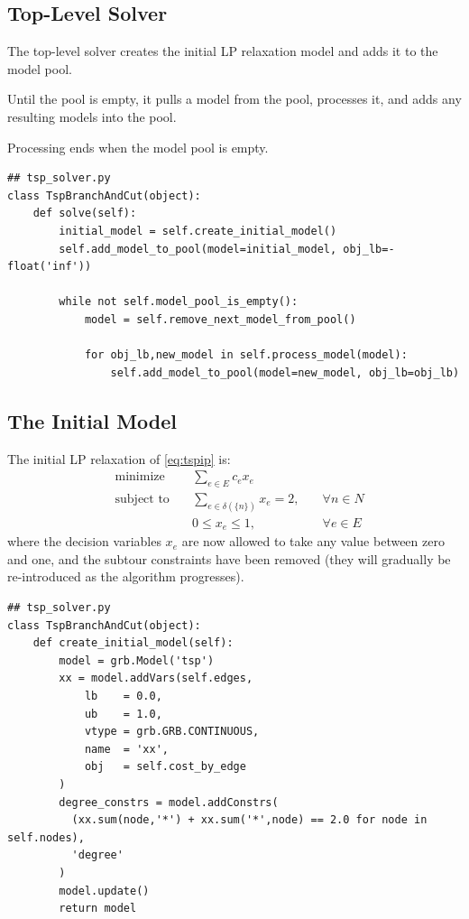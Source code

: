 \documentclass{article}
\begin{document}
\subsection{Top-Level Solver}
\begin{flushleft}

The top-level solver
creates the initial LP relaxation model
and adds it to the model pool.

Until the pool is empty,
it pulls a model from the pool,
processes it,
and adds any resulting models into the pool.

Processing ends when the model pool is empty.

\begin{lstlisting}
## tsp_solver.py
class TspBranchAndCut(object):
    def solve(self):
        initial_model = self.create_initial_model()
        self.add_model_to_pool(model=initial_model, obj_lb=-float('inf'))

        while not self.model_pool_is_empty():
            model = self.remove_next_model_from_pool()

            for obj_lb,new_model in self.process_model(model):
                self.add_model_to_pool(model=new_model, obj_lb=obj_lb)
\end{lstlisting}

\end{flushleft}

\subsection{The Initial Model}
\begin{flushleft}

The initial LP relaxation of \eqref{eq:tspip} is:
\begin{equation} \label{eq:tsplpinit}
\begin{alignedat}{3}
 & \text{minimize}         & \sum_{e \in E}{c_e x_e} & \\
 & \text{subject to} \quad & \sum_{e \in \delta(\{n\})}{x_e} = 2, \quad & \forall n \in N \\
 &                         & 0 \leq x_e \leq 1, \quad                     & \forall e \in E
\end{alignedat}
\end{equation}
where the decision variables $x_e$
are now allowed to take any value
between zero and one,
and the subtour constraints
have been removed
(they will gradually be re-introduced
as the algorithm progresses).

\begin{lstlisting}
## tsp_solver.py
class TspBranchAndCut(object):
    def create_initial_model(self):
        model = grb.Model('tsp')
        xx = model.addVars(self.edges,
            lb    = 0.0,
            ub    = 1.0,
            vtype = grb.GRB.CONTINUOUS,
            name  = 'xx',
            obj   = self.cost_by_edge
        )
        degree_constrs = model.addConstrs(
          (xx.sum(node,'*') + xx.sum('*',node) == 2.0 for node in self.nodes),
          'degree'
        )
        model.update()
        return model
\end{lstlisting}

\end{flushleft}
\end{document}
